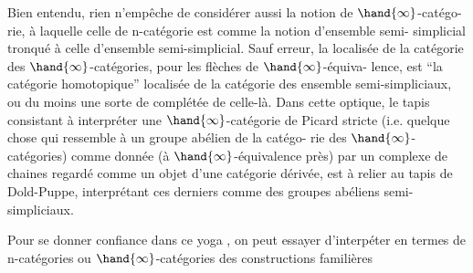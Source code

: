 Bien entendu, rien n'empêche de considérer aussi la notion de $\hand{\infty}$-catégo-%
rie, à laquelle celle de n-catégorie est comme la notion d'ensemble semi-
simplicial tronqué à celle d'ensemble semi-simplicial. Sauf erreur, la
localisée de la catégorie des $\hand{\infty}$-catégories, pour les flèches de $\hand{\infty}$-équiva-%
lence, est  ``la catégorie homotopique''\hand{,} localisée de la catégorie des ensemble
semi-simpliciaux, ou du moins une sorte de complétée de celle-là. Dans
cette optique, le tapis consistant à interpréter une $\hand{\infty}$-catégorie de Picard
stricte (i.e. quelque chose qui ressemble à un groupe abélien de la catégo-%
rie des $\hand{\infty}$-catégories) comme donnée (à $\hand{\infty}$-équivalence près) par un 
complexe de chaines regardé comme un objet d'une catégorie dérivée, est à
relier au tapis de Dold-Puppe, interprétant ces derniers comme des groupes
abéliens semi-simpliciaux.

Pour se donner confiance dans ce yoga , on peut essayer d'interpéter
en termes de n-catégories  ou $\hand{\infty}$-catégories des constructions familières

